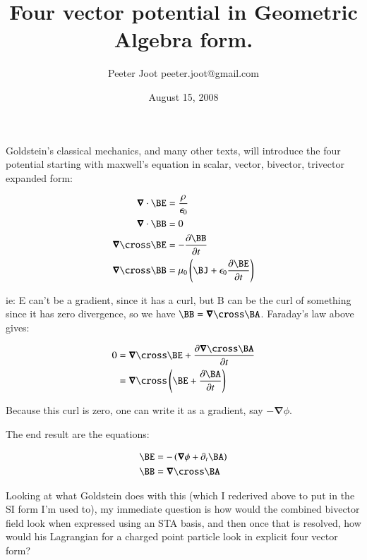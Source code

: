 \documentclass{article}
\title{ Four vector potential in Geometric Algebra form. }
\author{Peeter Joot \quad peeter.joot@gmail.com}
\date{August 15, 2008}
\newcommand{\spacegrad}[0]{\boldsymbol{\nabla}}
\begin{document}
             

\maketitle{}

\section{ }

Goldstein's classical mechanics, and many other texts, will introduce the four potential starting with 
maxwell's equation in scalar, vector, bivector, trivector expanded form:

\begin{align*}
\spacegrad \cdot \BE &= \frac{\rho}{\epsilon_0} \\
\spacegrad \cdot \BB &= 0 \\
\spacegrad \cross \BE &= - \frac{\partial \BB}{\partial t} \\
\spacegrad \cross \BB &= \mu_0\left(\BJ + \epsilon_0 \frac{\partial \BE}{\partial t}\right) \\
\end{align*}

ie: E can't be a gradient, since it has a curl, but B can be the curl of something since it has zero
divergence, so we have $\BB = \spacegrad \cross \BA$.  Faraday's law above gives:

\begin{align*}
0 &= \spacegrad \cross \BE + \frac{\partial \spacegrad \cross \BA}{\partial t} \\
&= \spacegrad \cross \left(\BE + \frac{\partial \BA}{\partial t}\right) \\
\end{align*}

Because this curl is zero, one can write it as a gradient, say $-\spacegrad \phi$.

The end result are the equations:

\begin{align}
\BE &= - \left( \spacegrad \phi + \partial_t \BA \right) \label{eqn:BE} \\
\BB &= \spacegrad \cross \BA \label{eqn:BB} 
\end{align}

Looking at what Goldstein does with this (which I rederived above to put in the SI form I'm used to), my
immediate question is how would the combined bivector field look when expressed using an STA basis, and 
then once that is resolved, how would his Lagrangian for a charged point particle look in explicit four
vector form?
\end{document}

